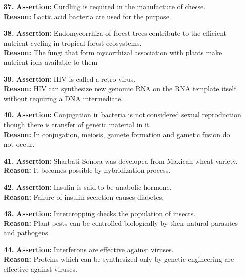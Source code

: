 \documentclass{article}
\begin{document}
\begin{enumerate}
    \item[\textbf{37.}] \textbf{Assertion:} Curdling is required in the manufacture of cheese. \\
    \textbf{Reason:} Lactic acid bacteria are used for the purpose.
    
    \item[\textbf{38.}] \textbf{Assertion:} Endomycorrhiza of forest trees contribute to the efficient nutrient cycling in tropical forest ecosystems. \\
    \textbf{Reason:} The fungi that form mycorrhizal association with plants make nutrient ions available to them.
    
    \item[\textbf{39.}] \textbf{Assertion:} HIV is called a retro virus. \\
    \textbf{Reason:} HIV can synthesize new genomic RNA on the RNA template itself without requiring a DNA intermediate.
    
    \item[\textbf{40.}] \textbf{Assertion:} Conjugation in bacteria is not considered sexual reproduction though there is transfer of genetic material in it. \\
    \textbf{Reason:} In conjugation, meiosis, gamete formation and gametic fusion do not occur.
    
    \item[\textbf{41.}] \textbf{Assertion:} Sharbati Sonora was developed from Maxican wheat variety. \\
    \textbf{Reason:} It becomes possible by hybridization process.
    
    \item[\textbf{42.}] \textbf{Assertion:} Insulin is said to be anabolic hormone. \\
    \textbf{Reason:} Failure of insulin secretion causes diabetes.
    
    \item[\textbf{43.}] \textbf{Assertion:} Intercropping checks the population of insects. \\
    \textbf{Reason:} Plant pests can be controlled biologically by their natural parasites and pathogens.
    
    \item[\textbf{44.}] \textbf{Assertion:} Interferons are effective against viruses. \\
    \textbf{Reason:} Proteins which can be synthesized only by genetic engineering are effective against viruses.
    

\end{enumerate}
\end{document}
